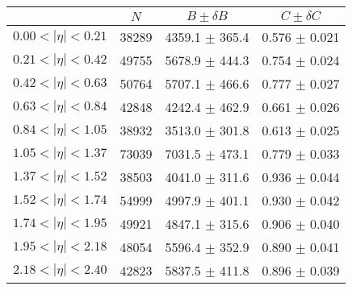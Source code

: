 \begin{tabular}{lccc}
\hline
    &   $N$   & $B \pm \delta B$  &  $C \pm \delta C$ \\
\hline
$0.00 < |\eta| <0.21$          & 38289      & 4359.1     $\pm$ 365.4 & 0.576      $\pm$ 0.021 \\
$0.21 < |\eta| <0.42$          & 49755      & 5678.9     $\pm$ 444.3 & 0.754      $\pm$ 0.024 \\
$0.42 < |\eta| <0.63$          & 50764      & 5707.1     $\pm$ 466.6 & 0.777      $\pm$ 0.027 \\
$0.63 < |\eta| <0.84$          & 42848      & 4242.4     $\pm$ 462.9 & 0.661      $\pm$ 0.026 \\
$0.84 < |\eta| <1.05$          & 38932      & 3513.0     $\pm$ 301.8 & 0.613      $\pm$ 0.025 \\
$1.05 < |\eta| <1.37$          & 73039      & 7031.5     $\pm$ 473.1 & 0.779      $\pm$ 0.033 \\
$1.37 < |\eta| <1.52$          & 38503      & 4041.0     $\pm$ 311.6 & 0.936      $\pm$ 0.044 \\
$1.52 < |\eta| <1.74$          & 54999      & 4997.9     $\pm$ 401.1 & 0.930      $\pm$ 0.042 \\
$1.74 < |\eta| <1.95$          & 49921      & 4847.1     $\pm$ 315.6 & 0.906      $\pm$ 0.040 \\
$1.95 < |\eta| <2.18$          & 48054      & 5596.4     $\pm$ 352.9 & 0.890      $\pm$ 0.041 \\
$2.18 < |\eta| <2.40$          & 42823      & 5837.5     $\pm$ 411.8 & 0.896      $\pm$ 0.039 \\
\hline
\end{tabular}
